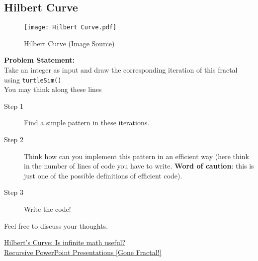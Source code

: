 \subsection{Hilbert Curve}{\label{pp:hilbertcurve}}
\begin{figure}[H]
	\centering
	\texttt{[image: Hilbert Curve.pdf]}
	\caption{Hilbert Curve (\href{https://www.cse.iitb.ac.in/~ranade/book.html}{Image Source})}
	\label{fig:hilbertcurve}
\end{figure}
\textbf{Problem Statement:}\\
Take an integer as input and draw the corresponding iteration of this fractal using \verb!turtleSim()!\\
You may think along these lines
\begin{description}
	\item[Step 1]Find a simple pattern in these iterations.
	\item[Step 2]Think how can you implement this pattern in an efficient way (here think in the number of lines of code you have to write. \textbf{Word of caution}: this is just one of the possible definitions of efficient code).
	\item[Step 3]Write the code!
\end{description}
Feel free to discuss your thoughts.
\begin{funvideo}
\href{https://www.youtube.com/watch?v=3s7h2MHQtxc&vl=en}{Hilbert's Curve: Is infinite math useful?}\\
\href{https://www.youtube.com/watch?v=b-Fa6HtvGtQ&t=4m44s}{Recursive PowerPoint Presentations [Gone Fractal!]}	
\end{funvideo}
